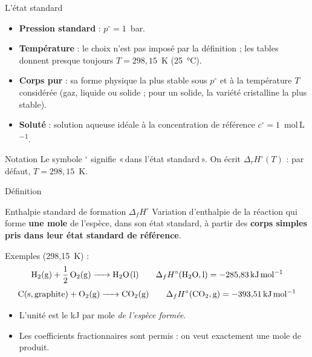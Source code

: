 \documentclass[aspectratio=169,10pt]{beamer}
\newcommand{\dfH}{\Delta_{f}H^{\circ}}
\newcommand{\kJmol}{\ensuremath{\,\mathrm{kJ\,mol^{-1}}}}
\newcommand{\guil}[1]{«\,#1\,»}
\begin{document}
\begin{frame}{L'état standard}
  \begin{itemize}
    \item \textbf{Pression standard} : $p^{\circ} = 1$~bar.
    \item \textbf{Température} : le choix n'est pas imposé par la définition ;
      les tables donnent presque toujours $T = 298{,}15$~K (25~°C).
    \item \textbf{Corps pur} : sa forme physique la plus stable sous $p^{\circ}$
      et à la température $T$ considérée (gaz, liquide ou solide ; pour un solide,
      la variété cristalline la plus stable).
    \item \textbf{Soluté} : solution aqueuse idéale à la concentration de
      référence $c^{\circ} = 1$~mol\,L\textsuperscript{$-1$}.
  \end{itemize}
  \vspace{2mm}
  \begin{block}{Notation}
    Le symbole $^{\circ}$ signifie \guil{dans l'état standard}. On écrit
    $\Delta_r H^{\circ}(T)$ : par défaut, $T = 298{,}15$~K.
  \end{block}
\end{frame}

\begin{frame}{Définition}
  \begin{block}{Enthalpie standard de formation $\dfH$}
    Variation d'enthalpie de la réaction qui forme \textbf{une mole} de
    l'espèce, dans son état standard, à partir des \textbf{corps simples pris
    dans leur état standard de référence}.
  \end{block}
  \vspace{2mm}
  Exemples (298,15~K) :
  \[
    \ce{H2(g) + 1/2 O2(g) -> H2O(l)} \qquad
    \dfH(\ce{H2O},\mathrm{l}) = -285{,}83\kJmol
  \]
  \[
    \ce{C(s,graphite) + O2(g) -> CO2(g)} \qquad
    \dfH(\ce{CO2},\mathrm{g}) = -393{,}51\kJmol
  \]
  \vspace{1mm}
  \begin{itemize}
    \item L'unité est le kJ par mole \emph{de l'espèce formée}.
    \item Les coefficients fractionnaires sont permis : on veut exactement une
      mole de produit.
  \end{itemize}
\end{frame}
\end{document}
